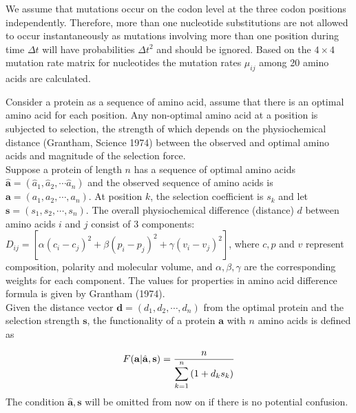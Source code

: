 \documentclass[13pt]{article}
\begin{document}
We assume that mutations occur on the codon level at the three codon positions independently. Therefore, more than one nucleotide substitutions are not allowed to occur instantaneously as mutations involving more than one position during time $\Delta t$ will have probabilities $\Delta t^2$ and should be ignored. Based on the $4 \times 4$ mutation rate matrix for nucleotides the mutation rates $\mu_{ij}$ among 20 amino acids are calculated.

Consider a protein as a sequence of amino acid, assume that there is an optimal amino acid for each position. Any non-optimal amino acid at a position is subjected to selection, the strength of which depends on the physiochemical distance (Grantham, Science 1974) between the observed and optimal amino acids and magnitude of the selection force. \\

Suppose a protein of length $n$ has a sequence of optimal amino acids $\hat{\mathbf{a}} = (\hat{a}_1, \hat{a}_2, \cdots \hat{a}_n)$  and the observed sequence of amino acids is $\mathbf{a} = (a_1, a_2, \cdots, a_n)$. At position $k$, the selection coefficient is $s_k$ and let $\mathbf{s}=(s_1,s_2,\cdots,s_n)$. The overall physiochemical difference (distance) $d$ between amino acids $i$ and $j$ consist of 3 components: $D_{ij} = [\alpha (c_i-c_j)^2 + \beta (p_i - p_j)^2 + \gamma (v_i - v_j)^2]$, where $c, p$ and $v$ represent composition, polarity and molecular volume, and $\alpha, \beta, \gamma$ are the corresponding weights for each component. The values for properties in amino acid difference formula is given by Grantham (1974). \\

Given the distance vector $\mathbf{d} = (d_1, d_2, \cdots, d_n)$ from the optimal protein and the selection strength $\mathbf{s}$, the functionality of a protein $\mathbf{a}$ with $n$ amino acids is defined as

\begin{equation}
F(\mathbf{a}| \hat{\mathbf{a}},\mathbf{s})  =  \frac{n}{\displaystyle  \sum_{k=1}^n{(1+d_ks_k)}} \label{eq:harmonic}\\
\end{equation}
The condition $\hat{\mathbf{a}},\mathbf{s}$ will be omitted from now on if there is no potential confusion.\\
\end{document}
